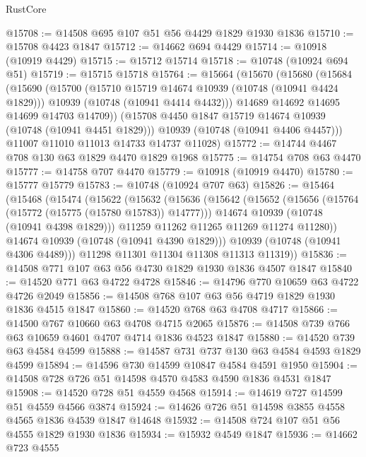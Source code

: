 \begin{lexlean}{RustCore}
\begin{coremodule}
@15708 := @14508 @695 @107 @51 @56 @4429 @1829 @1930 @1836
@15710 := @15708 @4423 @1847
@15712 := @14662 @694 @4429
@15714 := @10918 (@10919 @4429)
@15715 := @15712 @15714
@15718 := @10748 (@10924 @694 @51)
@15719 := @15715 @15718
@15764 := @15664
    (@15670
      (@15680
        (@15684
          (@15690
            (@15700
              (@15710 @15719 @14674 @10939 (@10748 (@10941 @4424 @1829)))
              @10939
              (@10748 (@10941 @4414 @4432)))
            @14689
            @14692
            @14695
            @14699
            @14703
            @14709))
        (@15708 @4450 @1847 @15719 @14674 @10939 (@10748 (@10941 @4451 @1829)))
        @10939
        (@10748 (@10941 @4406 @4457)))
      @11007
      @11010
      @11013
      @14733
      @14737
      @11028)
@15772 := @14744 @4467 @708 @130 @63 @1829 @4470 @1829 @1968
@15775 := @14754 @708 @63 @4470
@15777 := @14758 @707 @4470
@15779 := @10918 (@10919 @4470)
@15780 := @15777 @15779
@15783 := @10748 (@10924 @707 @63)
@15826 := @15464
    (@15468
      (@15474
        (@15622
          (@15632
            (@15636
              (@15642
                (@15652
                  (@15656 (@15764 (@15772 (@15775 (@15780 @15783)) @14777)))
                  @14674
                  @10939
                  (@10748 (@10941 @4398 @1829)))
                @11259
                @11262
                @11265
                @11269
                @11274
                @11280))
            @14674
            @10939
            (@10748 (@10941 @4390 @1829)))
          @10939
          (@10748 (@10941 @4306 @4489)))
        @11298
        @11301
        @11304
        @11308
        @11313
        @11319))
@15836 := @14508 @771 @107 @63 @56 @4730 @1829 @1930 @1836 @4507 @1847
@15840 := @14520 @771 @63 @4722 @4728
@15846 := @14796 @770 @10659 @63 @4722 @4726 @2049
@15856 := @14508 @768 @107 @63 @56 @4719 @1829 @1930 @1836 @4515 @1847
@15860 := @14520 @768 @63 @4708 @4717
@15866 := @14500 @767 @10660 @63 @4708 @4715 @2065
@15876 := @14508 @739 @766 @63 @10659 @4601 @4707 @4714 @1836 @4523 @1847
@15880 := @14520 @739 @63 @4584 @4599
@15888 := @14587 @731 @737 @130 @63 @4584 @4593 @1829 @4599
@15894 := @14596 @730 @14599 @10847 @4584 @4591 @1950
@15904 := @14508 @728 @726 @51 @14598 @4570 @4583 @4590 @1836 @4531 @1847
@15908 := @14520 @728 @51 @4559 @4568
@15914 := @14619 @727 @14599 @51 @4559 @4566 @3874
@15924 := @14626 @726 @51 @14598 @3855 @4558 @4565 @1836 @4539 @1847 @14648
@15932 := @14508 @724 @107 @51 @56 @4555 @1829 @1930 @1836
@15934 := @15932 @4549 @1847
@15936 := @14662 @723 @4555

\end{coremodule}
\end{lexlean}
